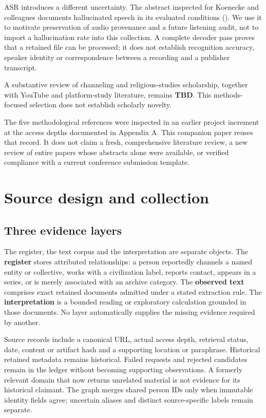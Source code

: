 \documentclass[
  11pt,
]{article}
\begin{document}
ASR introduces a different uncertainty. The abstract inspected for
Koenecke and colleagues documents hallucinated speech in its evaluated
conditions (). We use
it to motivate preservation of audio provenance and a future listening
audit, not to import a hallucination rate into this collection. A
complete decoder pass proves that a retained file can be processed; it
does not establish recognition accuracy, speaker identity or
correspondence between a recording and a publisher transcript.

A substantive review of channeling and religious-studies scholarship,
together with YouTube and platform-study literature, remains
\textbf{TBD}. This methods-focused selection does not establish
scholarly novelty.

The five methodological references were inspected in an earlier project
increment at the access depths documented in Appendix A. This companion
paper reuses that record. It does not claim a fresh, comprehensive
literature review, a new review of entire papers whose abstracts alone
were available, or verified compliance with a current conference
submission template.

\FloatBarrier

\section{Source design and
collection}\label{source-design-and-collection}

\FloatBarrier

\subsection{Three evidence layers}\label{three-evidence-layers}

The register, the text corpus and the interpretation are separate
objects. The \textbf{register} stores attributed relationships: a person
reportedly channels a named entity or collective, works with a
civilization label, reports contact, appears in a series, or is merely
associated with an archive category. The \textbf{observed text}
comprises exact retained documents admitted under a stated extraction
rule. The \textbf{interpretation} is a bounded reading or exploratory
calculation grounded in those documents. No layer automatically supplies
the missing evidence required by another.

Source records include a canonical URL, actual access depth, retrieval
status, date, content or artifact hash and a supporting location or
paraphrase. Historical retained metadata remains historical. Failed
requests and rejected candidates remain in the ledger without becoming
supporting observations. A formerly relevant domain that now returns
unrelated material is not evidence for its historical claimant. The
graph merges shared person IDs only when immutable identity fields
agree; uncertain aliases and distinct source-specific labels remain
separate.
\end{document}
